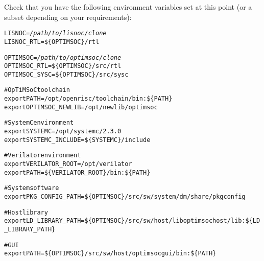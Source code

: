 Check that you have the following environment variables set at this
point (or a subset depending on your requirements):

\begin{alltt}
LISNOC = \emph{/path/to/lisnoc/clone}
LISNOC_RTL = \$\{OPTIMSOC\}/rtl

OPTIMSOC = \emph{/path/to/optimsoc/clone}
OPTIMSOC_RTL = \$\{OPTIMSOC\}/src/rtl
OPTIMSOC_SYSC = \$\{OPTIMSOC\}/src/sysc


# OpTiMSoC toolchain
export PATH=/opt/openrisc/toolchain/bin:\$\{PATH\}
export OPTIMSOC_NEWLIB=/opt/newlib/optimsoc

# SystemC environment
export SYSTEMC=/opt/systemc/2.3.0
export SYSTEMC_INCLUDE=\$\{SYSTEMC\}/include

# Verilator environment
export VERILATOR\_ROOT=/opt/verilator
export PATH=\$\{VERILATOR_ROOT\}/bin:\$\{PATH\}

# System software
export PKG_CONFIG_PATH=\$\{OPTIMSOC\}/src/sw/system/dm/share/pkgconfig

# Host library
export LD_LIBRARY_PATH=\$\{OPTIMSOC\}/src/sw/host/liboptimsochost/lib:\$\{LD_LIBRARY_PATH\}

# GUI
export PATH=\$\{OPTIMSOC\}/src/sw/host/optimsocgui/bin:\$\{PATH\}


\end{alltt}